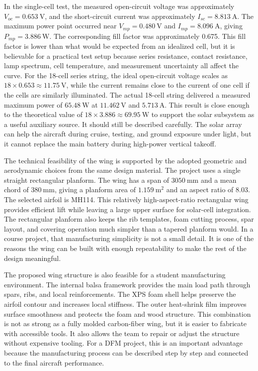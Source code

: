 In the single-cell test, the measured open-circuit voltage was approximately \(V_{oc}=0.653~\mathrm{V}\), and the short-circuit current was approximately \(I_{sc}=8.813~\mathrm{A}\). The maximum power point occurred near \(V_{mp}=0.480~\mathrm{V}\) and \(I_{mp}=8.096~\mathrm{A}\), giving \(P_{mp}=3.886~\mathrm{W}\). The corresponding fill factor was approximately 0.675. This fill factor is lower than what would be expected from an idealized cell, but it is believable for a practical test setup because series resistance, contact resistance, lamp spectrum, cell temperature, and measurement uncertainty all affect the curve. For the 18-cell series string, the ideal open-circuit voltage scales as \(18 \times 0.653 \approx 11.75~\mathrm{V}\), while the current remains close to the current of one cell if the cells are similarly illuminated. The actual 18-cell string delivered a measured maximum power of \(65.48~\mathrm{W}\) at \(11.462~\mathrm{V}\) and \(5.713~\mathrm{A}\). This result is close enough to the theoretical value of \(18 \times 3.886 \approx 69.95~\mathrm{W}\) to support the solar subsystem as a useful auxiliary source. It should still be described carefully. The solar array can help the aircraft during cruise, testing, and ground exposure under light, but it cannot replace the main battery during high-power vertical takeoff.

The technical feasibility of the wing is supported by the adopted geometric and aerodynamic choices from the same design material. The project uses a single straight rectangular planform. The wing has a span of \(3050~\mathrm{mm}\) and a mean chord of \(380~\mathrm{mm}\), giving a planform area of \(1.159~\mathrm{m^2}\) and an aspect ratio of 8.03. The selected airfoil is MH114. This relatively high-aspect-ratio rectangular wing provides efficient lift while leaving a large upper surface for solar-cell integration. The rectangular planform also keeps the rib templates, foam cutting process, spar layout, and covering operation much simpler than a tapered planform would. In a course project, that manufacturing simplicity is not a small detail. It is one of the reasons the wing can be built with enough repeatability to make the rest of the design meaningful.

The proposed wing structure is also feasible for a student manufacturing environment. The internal balsa framework provides the main load path through spars, ribs, and local reinforcements. The XPS foam shell helps preserve the airfoil contour and increases local stiffness. The outer heat-shrink film improves surface smoothness and protects the foam and wood structure. This combination is not as strong as a fully molded carbon-fiber wing, but it is easier to fabricate with accessible tools. It also allows the team to repair or adjust the structure without expensive tooling. For a DFM project, this is an important advantage because the manufacturing process can be described step by step and connected to the final aircraft performance.

